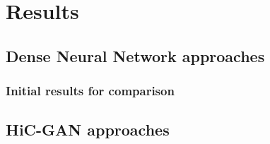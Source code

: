 \section{Results}
\subsection{Dense Neural Network approaches}
\subsubsection{Initial results for comparison} \label{sec:initialDNNresults}
\subsection{HiC-GAN approaches}

